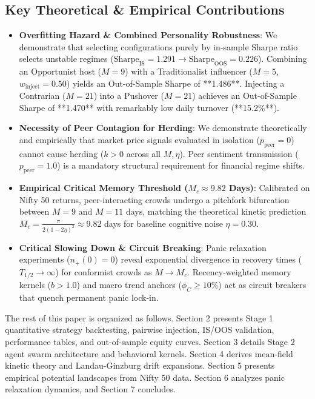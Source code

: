 \documentclass[11pt,a4paper]{article}
\begin{document}
\subsection{Key Theoretical \& Empirical Contributions}
\begin{itemize}
    \item \textbf{Overfitting Hazard \& Combined Personality Robustness}: We demonstrate that selecting configurations purely by in-sample Sharpe ratio selects unstable regimes ($\text{Sharpe}_{\text{IS}} = 1.291 \to \text{Sharpe}_{\text{OOS}} = 0.226$). Combining an Opportunist host ($M=9$) with a Traditionalist influencer ($M=5$, $w_{\text{inject}}=0.50$) yields an Out-of-Sample Sharpe of **1.486**. Injecting a Contrarian ($M=21$) into a Pushover ($M=21$) achieves an Out-of-Sample Sharpe of **1.470** with remarkably low daily turnover (**15.2\%**).
    \item \textbf{Necessity of Peer Contagion for Herding}: We demonstrate theoretically and empirically that market price signals evaluated in isolation ($p_{\text{peer}}=0$) cannot cause herding ($k>0$ across all $M, \eta$). Peer sentiment transmission ($p_{\text{peer}}=1.0$) is a mandatory structural requirement for financial regime shifts.
    \item \textbf{Empirical Critical Memory Threshold ($M_c \approx 9.82$ Days)}: Calibrated on Nifty 50 returns, peer-interacting crowds undergo a pitchfork bifurcation between $M=9$ and $M=11$ days, matching the theoretical kinetic prediction $M_c = \frac{\pi}{2(1-2\eta)^2} \approx 9.82$ days for baseline cognitive noise $\eta = 0.30$.
    \item \textbf{Critical Slowing Down \& Circuit Breaking}: Panic relaxation experiments ($n_+(0)=0$) reveal exponential divergence in recovery times ($T_{1/2} \to \infty$) for conformist crowds as $M \to M_c$. Recency-weighted memory kernels ($b>1.0$) and macro trend anchors ($\phi_C \ge 10\%$) act as circuit breakers that quench permanent panic lock-in.
\end{itemize}

The rest of this paper is organized as follows. Section 2 presents Stage 1 quantitative strategy backtesting, pairwise injection, IS/OOS validation, performance tables, and out-of-sample equity curves. Section 3 details Stage 2 agent swarm architecture and behavioral kernels. Section 4 derives mean-field kinetic theory and Landau-Ginzburg drift expansions. Section 5 presents empirical potential landscapes from Nifty 50 data. Section 6 analyzes panic relaxation dynamics, and Section 7 concludes.
\end{document}
